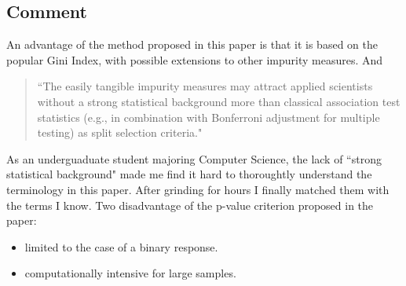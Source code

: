 \documentclass[a4paper]{article}
\begin{document}
        \subsection{Comment}
        An advantage of the method proposed in this paper is that it is based on the popular Gini Index, with possible extensions to other impurity measures. And 
        \begin{quote}
            ``The easily tangible impurity measures may attract applied scientists without a strong statistical background more than classical association test statistics (e.g., in combination with Bonferroni adjustment for multiple testing) as split selection criteria."
        \end{quote}
        As an underguaduate student majoring Computer Science, the lack of ``strong statistical background" made me find it hard to thoroughtly understand the terminology in this paper. After grinding for hours I finally matched them with the terms I know. Two disadvantage of the p-value criterion proposed in the paper:
        \begin{itemize}
            \item limited to the case of a binary response.
            \item computationally intensive for large samples.
        \end{itemize}
\end{document}
